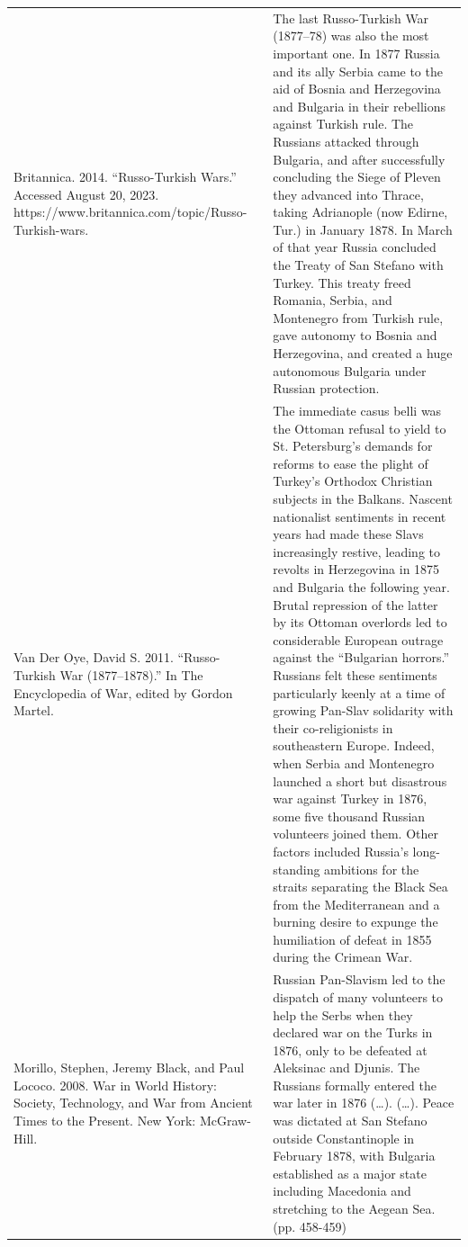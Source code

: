 {\begin{longtable}{p{}p{}}
Britannica. 2014. “Russo-Turkish Wars.” Accessed August 20, 2023. https://www.britannica.com/topic/Russo-Turkish-wars. & The last Russo-Turkish War (1877–78) was also the most important one. In 1877 Russia and its ally Serbia came to the aid of Bosnia and Herzegovina and Bulgaria in their rebellions against Turkish rule. The Russians attacked through Bulgaria, and after successfully concluding the Siege of Pleven they advanced into Thrace, taking Adrianople (now Edirne, Tur.) in January 1878. In March of that year Russia concluded the Treaty of San Stefano with Turkey. This treaty freed Romania, Serbia, and Montenegro from Turkish rule, gave autonomy to Bosnia and Herzegovina, and created a huge autonomous Bulgaria under Russian protection.
\\
Van Der Oye, David S. 2011. “Russo-Turkish War (1877–1878).” In The Encyclopedia of War, edited by Gordon Martel. & The immediate casus belli was the Ottoman refusal to yield to St. Petersburg's demands for reforms to ease the plight of Turkey's Orthodox Christian subjects in the Balkans. Nascent nationalist sentiments in recent years had made these Slavs increasingly restive, leading to revolts in Herzegovina in 1875 and Bulgaria the following year. Brutal repression of the latter by its Ottoman overlords led to considerable European outrage against the “Bulgarian horrors.” Russians felt these sentiments particularly keenly at a time of growing Pan-Slav solidarity with their co-religionists in southeastern Europe. Indeed, when Serbia and Montenegro launched a short but disastrous war against Turkey in 1876, some five thousand Russian volunteers joined them. Other factors included Russia's long-standing ambitions for the straits separating the Black Sea from the Mediterranean and a burning desire to expunge the humiliation of defeat in 1855 during the Crimean War.
\\
Morillo, Stephen, Jeremy Black, and Paul Lococo. 2008. War in World History: Society, Technology, and War from Ancient Times to the Present. New York: McGraw-Hill. & Russian Pan-Slavism led to the dispatch of many volunteers to help the Serbs when they declared war on the Turks in 1876, only to be defeated at Aleksinac and Djunis. The Russians formally entered the war later in 1876 (…). (…). Peace was dictated at San Stefano outside Constantinople in February 1878, with Bulgaria established as a major state including Macedonia and stretching to the Aegean Sea. (pp. 458-459)
\\

\end{longtable}}
